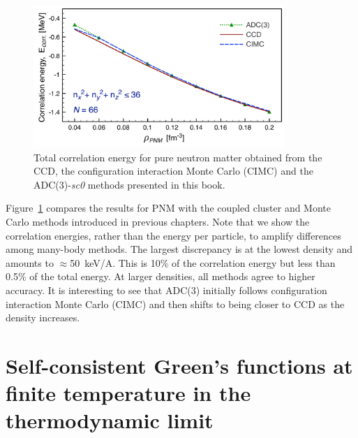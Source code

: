 \begin{figure}[t]
\begin{center}
\includegraphics[width=0.85\textwidth]{Chapter11-figures/PNM_Ecorr_Comp.pdf}
\caption{Total correlation energy for pure neutron matter obtained from the CCD, the configuration interaction Monte Carlo (CIMC) and the ADC(3)-{\em sc0} methods presented in this book. }
\label{fig:minn_all}
\end{center}
\end{figure}


Figure~\ref{fig:minn_all} compares the results for PNM with  the coupled cluster and Monte Carlo methods introduced in previous chapters.  Note that we show the correlation energies, rather than the energy per particle, to amplify differences among many-body methods. The largest discrepancy is at the lowest density and amounts to $\approx$50~keV/A. This is 10\% of the correlation energy but less than 0.5\% of the total energy.  At larger densities, all methods agree to higher accuracy.  It is interesting to see that ADC(3) initially follows configuration interaction Monte Carlo (CIMC) and then shifts to being closer to CCD as the density increases.





\section{Self-consistent Green's functions at finite temperature in the thermodynamic limit}
\label{sec:scgf_finiteT}


